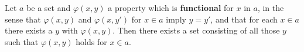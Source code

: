 Let $a$ be a set and $\varphi(x, y)$ a property which is \textbf{functional} for $x$ in $a$, in the sense that $\varphi(x, y)$ and $\varphi(x, y')$ for $x \in a$ imply $y = y'$, and that for each $x \in a$ there exists a $y$ with $\varphi(x, y)$. Then there exists a set consisting of all those $y$ such that $\varphi(x, y)$ holds for $x \in a$.

